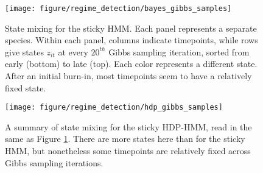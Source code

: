 \begin{figure}
  \centering
  \texttt{[image: figure/regime\_detection/bayes\_gibbs\_samples]}
  \caption{State mixing for the sticky HMM. Each panel represents a separate
    species. Within each panel, columns indicate timepoints, while rows give
    states $z_{it}$ at every $20^{th}$ Gibbs sampling iteration, sorted from
    early (bottom) to late (top). Each color represents a different state. After
    an initial burn-in, most timepoints seem to have a relatively fixed
    state. \label{fig:bayes_gibbs_samples} }
\end{figure}

\begin{figure}
  \centering
  \texttt{[image: figure/regime\_detection/hdp\_gibbs\_samples]}
  \caption{
    A summary of state mixing for the sticky HDP-HMM, read in the same as Figure
    \ref{fig:bayes_gibbs_samples}. There are more states here than for the
    sticky HMM, but nonetheless some timepoints are relatively fixed across
    Gibbs sampling iterations.
    \label{fig:hdp_gibbs_samples} }
\end{figure}
